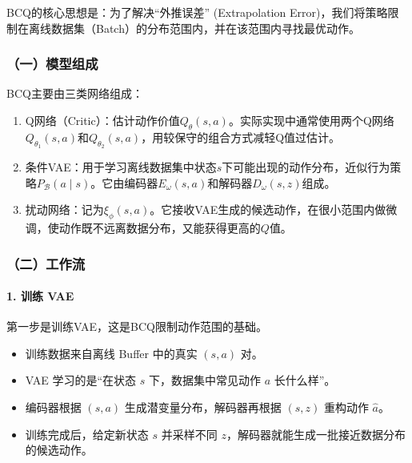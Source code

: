 BCQ的核心思想是：为了解决``外推误差'' (Extrapolation Error)，我们将策略限制在离线数据集（Batch）的分布范围内，并在该范围内寻找最优动作。

\hypertarget{ux4e00ux6a21ux578bux7ec4ux6210}{%
\subsubsection{（一）模型组成}\label{ux4e00ux6a21ux578bux7ec4ux6210}}

BCQ主要由三类网络组成：

\begin{enumerate}
\def\labelenumi{\arabic{enumi}.}
\tightlist
\item
  Q网络（Critic）：估计动作价值\(Q_\theta(s,a)\)。实际实现中通常使用两个Q网络\(Q_{\theta_1}(s,a)\)和\(Q_{\theta_2}(s,a)\)，用较保守的组合方式减轻Q值过估计。
\item
  条件VAE：用于学习离线数据集中状态\(s\)下可能出现的动作分布，近似行为策略\(P_{\mathcal B}(a \mid s)\)。它由编码器\(E_\omega(s,a)\)和解码器\(D_\omega(s,z)\)组成。
\item
  扰动网络：记为\(\xi_\phi(s,a)\)。它接收VAE生成的候选动作，在很小范围内做微调，使动作既不远离数据分布，又能获得更高的\(Q\)值。
\end{enumerate}

\hypertarget{ux4e8cux5de5ux4f5cux6d41}{%
\subsubsection{（二）工作流}\label{ux4e8cux5de5ux4f5cux6d41}}

\hypertarget{ux8badux7ec3-vae}{%
\paragraph{1. 训练 VAE}\label{ux8badux7ec3-vae}}

第一步是训练VAE，这是BCQ限制动作范围的基础。

\begin{itemize}
\tightlist
\item
  训练数据来自离线 Buffer 中的真实 \((s,a)\) 对。
\item
  VAE 学习的是``在状态 \(s\) 下，数据集中常见动作 \(a\) 长什么样''。
\item
  编码器根据 \((s,a)\) 生成潜变量分布，解码器再根据 \((s,z)\) 重构动作 \(\hat{a}\)。
\item
  训练完成后，给定新状态 \(s\) 并采样不同 \(z\)，解码器就能生成一批接近数据分布的候选动作。
\end{itemize}

